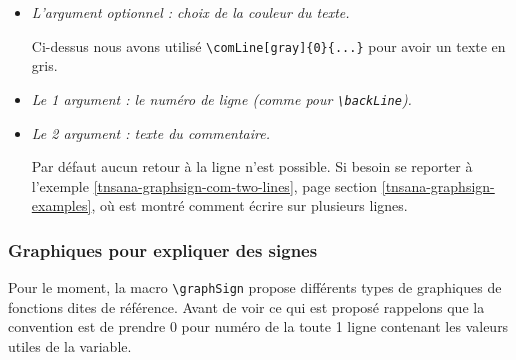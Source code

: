 \documentclass[12pt,a4paper]{article}
\newcommand\env[1]{\texttt{#1}}
\newcommand\macro[1]{\env{\textbackslash{}#1}}
\theoremstyle{definition}
\begin{document}
\begin{itemize}[label=\small\textbullet, itemsep=.25em]
    \item \textit{L'argument optionnel : choix de la couleur du texte.}
          
          \smallskip
          
          Ci-dessus nous avons utilisé \verb#\comLine[gray]{0}{...}# pour avoir un texte en gris.


    \item \textit{Le 1\ier{} argument : le numéro de ligne \emph{(comme pour \macro{backLine})}.}


    \item \textit{Le 2\ieme{} argument : texte du commentaire.}
          
          \smallskip
          
          Par défaut aucun retour à la ligne n'est possible.
          Si besoin se reporter à l'exemple \ref{tnsana-graphsign-com-two-lines},  page \pageref{tnsana-graphsign-com-two-lines} section \ref{tnsana-graphsign-examples}, où est montré comment écrire sur plusieurs lignes.
\end{itemize}




\subsubsection{Graphiques pour expliquer des signes}

Pour le moment, la macro \macro{graphSign} propose différents types de graphiques de fonctions dites de référence.
Avant de voir ce qui est proposé rappelons que la convention est de prendre $0$ pour numéro de la toute 1\iere{} ligne contenant les valeurs utiles de la variable.
\end{document}
